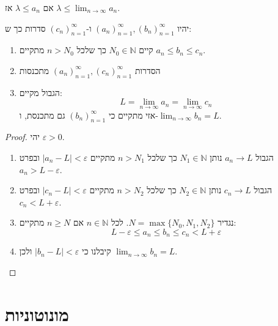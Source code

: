 \documentclass{tstextbook}
\begin{document}
\begin{corollary}
אם \(\lambda \leq a_{n}\) אז \(\lambda \leq \lim_{ n \to \infty }a_{n}\).

\end{corollary}
\begin{theorem}[הכריך]
יהיו \((a_n)_{n=1}^\infty,(b_{n})_{n=1}^\infty\) ו-\((c_n)_{n=1}^\infty\) סדרות כך ש:

  \begin{enumerate}
    \item קיים \(N_{0} \in \mathbb{N}\) כך שלכל \(n>N_{0}\) מתקיים \(a_{n}\leq b_{n}\leq c_{n}\). 


    \item הסדרות \((a_n)_{n=1}^\infty,(c_n)_{n=1}^\infty\) מתכנסות 


    \item הגבול מקיים: 
$$L=\lim_{ n \to \infty } a_{n}=\lim_{ n \to \infty }c_{n} $$
אזי מתקיים כי \((b_{n})_{n=1}^\infty\) גם מתכנסת, ו-\(\lim_{ n \to \infty }b_{n}=L\).


  \end{enumerate}
\end{theorem}
\begin{proof}
יהי \(\varepsilon>0\).

  \begin{enumerate}
    \item הגבול \(a_{n}\to L\) נותן \(N_{1} \in \mathbb{N}\) כך שלכל \(n>N_{1}\) מתקיים \(|a_{n}-L|<\varepsilon\) ובפרט \(a_{n}>L-\varepsilon\). 


    \item הגבול \(c_{n}\to L\) נותן \(N_{2} \in \mathbb{N}\) כך שלכל \(n>N_{2}\) מתקיים \(|c_{n}-L|<\varepsilon\) ובפרט \(c_{n}<L+\varepsilon\). 


    \item נגדיר \(N=\max\{ N_{0},N_{1},N_{2} \}\). לכל \(n \in \mathbb{N}\) אם \(n\geq N\) מתקיים: 
$$L-\varepsilon \leq a_{n}\leq b_{n}\leq c_{n}<L+\varepsilon$$


    \item קיבלנו כי \(|b_{n}-L|<\varepsilon\) ולכן \(\lim_{ n \to \infty }b_{n}=L\). 


  \end{enumerate}
\end{proof}
\section{מונוטוניות}
\end{document}
